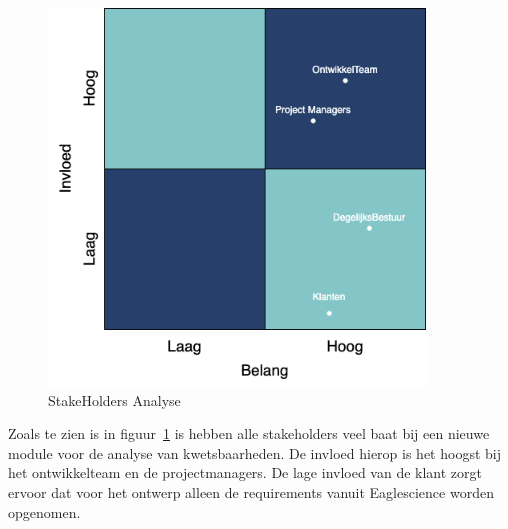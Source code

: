 \begin{figure}
    \myfloatalign
    \includegraphics[width=10cm]{gfx/stakeholderanalyse}
    \caption{StakeHolders Analyse}
    \label{fig:StakeholderAnalyse1}
\end{figure}
Zoals te zien is in figuur~\ref{fig:StakeholderAnalyse1} is hebben alle stakeholders veel baat bij een nieuwe module voor de analyse van kwetsbaarheden. De invloed hierop is het hoogst bij het ontwikkelteam en de projectmanagers. De lage invloed van de klant zorgt ervoor dat voor het ontwerp alleen de requirements vanuit Eaglescience worden opgenomen.

